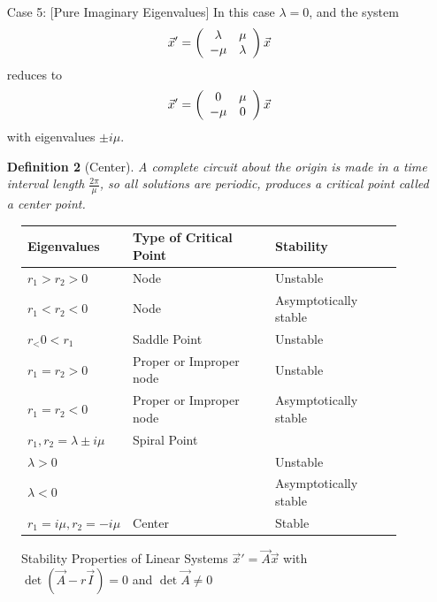 \documentclass[10pt]{report}
\newtheorem{def3}{Definition}[subsection]
\begin{document}
\begin{itemize}
Suppose that the eigenvalues are $\lambda \pm i\mu$, where $\lambda$ and $\mu$ are real valued, $\lambda\neq 0$ and $\mu >0$.
\begin{def3}[Spiral Point]
The critical point, when the eigenvalues are complex with nonzero real parts, is called a spiral point. Frequently, the terms spiral sink and spiral source, respectively, are used to refer to spiral pouts whose tractories approach, or depart from, the critical point.
\end{def3}
\item[Case 5:][Pure Imaginary Eigenvalues]
In this case $\lambda = 0$, and the system
$$\vec{x}' = \left(
\begin{array}{c c}
\lambda & \mu \\
-\mu & \lambda
\end{array}
\right)\vec{x}$$
reduces to
$$\vec{x}' = \left(
\begin{array}{c c}
0 & \mu \\
-\mu & 0
\end{array}
\right)\vec{x}$$
with eigenvalues $\pm i\mu$.
\begin{def3}[Center]
A complete circuit about the origin is made in a time interval length $\frac{2\pi}{\mu}$, so all solutions are periodic, produces a critical point called a center point.
\end{def3}
\end{itemize}
\begin{figure}[h]
\caption{Stability Properties of Linear Systems $\vec{x}' = \vec{A}\vec{x}$ with $\det(\vec{A}-r\vec{I})=0$ and $\det\vec{A}\neq 0$}
\begin{tabular}{| l | l | l |}
\hline
Eigenvalues & Type of Critical Point & Stability\\\hline \hline
$r_1 > r_2 >0$ & Node & Unstable\\ \hline
$r_1 < r_2 <0$ & Node & Asymptotically stable\\\hline
$r_<  0 <  r_1$ & Saddle Point & Unstable\\\hline
$r_1 = r_2 >0$ & Proper or Improper node & Unstable\\\hline
$r_1 = r_2 <0$ & Proper or Improper node & Asymptotically stable\\\hline
$r_1, r_2 =\lambda \pm i\mu$ & Spiral Point & \\\hline
$\lambda > 0$ & & Unstable\\\hline
$\lambda < 0$ & & Asymptotically stable\\\hline
$r_1 =i\mu, r_2 =-i\mu$ & Center & Stable\\\hline
\end{tabular}
\end{figure}
\end{document}
